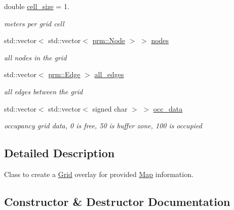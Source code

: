 \begin{DoxyCompactItemize}
\mbox{\label{classgrid_1_1Grid_acb1ca003a2aeafe6b554d9ac27b29109}} 
double \hyperlink{classgrid_1_1Grid_acb1ca003a2aeafe6b554d9ac27b29109}{cell\+\_\+size} = 1.
\begin{DoxyCompactList}\small\item\em meters per grid cell \end{DoxyCompactList}\item 
\mbox{\label{classgrid_1_1Grid_a970c0980c3a662ddaddd9e457f799252}} 
std\+::vector$<$ std\+::vector$<$ \hyperlink{structprm_1_1Node}{prm\+::\+Node} $>$ $>$ \hyperlink{classgrid_1_1Grid_a970c0980c3a662ddaddd9e457f799252}{nodes}
\begin{DoxyCompactList}\small\item\em all nodes in the grid \end{DoxyCompactList}\item 
\mbox{\label{classgrid_1_1Grid_a80fab4482c55128e29083184c234f197}} 
std\+::vector$<$ \hyperlink{structprm_1_1Edge}{prm\+::\+Edge} $>$ \hyperlink{classgrid_1_1Grid_a80fab4482c55128e29083184c234f197}{all\+\_\+edges}
\begin{DoxyCompactList}\small\item\em all edges between the grid \end{DoxyCompactList}\item 
\mbox{\label{classgrid_1_1Grid_a640e9d8f352ebb19ec2801229e5483e4}} 
std\+::vector$<$ std\+::vector$<$ signed char $>$ $>$ \hyperlink{classgrid_1_1Grid_a640e9d8f352ebb19ec2801229e5483e4}{occ\+\_\+data}
\begin{DoxyCompactList}\small\item\em occupancy grid data, 0 is free, 50 is buffer zone, 100 is occupied \end{DoxyCompactList}\end{DoxyCompactItemize}


\subsection{Detailed Description}
Class to create a \hyperlink{classgrid_1_1Grid}{Grid} overlay for provided \hyperlink{structgrid_1_1Map}{Map} information. 

\subsection{Constructor \& Destructor Documentation}
\mbox{\label{classgrid_1_1Grid_a39cd30c1ee231fde7f5a3f228a326ac1}} 
